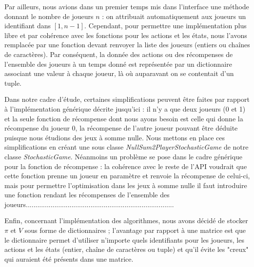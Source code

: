 \documentclass{article}
\begin{document}
Par ailleurs, nous avions dans un premier temps mis dans l'interface une méthode donnant le nombre de joueurs \(n\) : on attribuait automatiquement aux joueurs un identifiant dans \([1, n-1]\). Cependant, pour permettre une implémentation plus libre et par cohérence avec les fonctions pour les actions et les états, nous l'avons remplacée par une fonction devant renvoyer la liste des joueurs (entiers ou chaînes de caractères). Par conséquent, la donnée des actions ou des récompenses de l'ensemble des joueurs à un temps donné est représentée par un dictionnaire associant une valeur à chaque joueur, là où auparavant on se contentait d'un tuple.

Dans notre cadre d'étude, certaines simplifications peuvent être faites par rapport à l'implémentation générique décrite jusqu'ici : il n'y a que deux joueurs (0 et 1) et la seule fonction de récompense dont nous ayons besoin est celle qui donne la récompense du joueur 0, la récompense de l'autre joueur pouvant être déduite puisque nous étudions des jeux à somme nulle. Nous mettons en place ces simplifications en créant une sous classe \textit{NullSum2PlayerStochasticGame} de notre classe \textit{StochasticGame}. Néanmoins un problème se pose dans le cadre générique pour la fonction de récompense : la cohérence avec le reste de l'API voudrait que cette fonction prenne un joueur en paramètre et renvoie la récompense de celui-ci, mais pour permettre l'optimisation dans les jeux à somme nulle il faut introduire une fonction rendant les récompenses de l'ensemble des joueurs..............................................................................

Enfin, concernant l'implémentation des algorithmes, nous avons décidé de stocker \(\pi\) et \(V\) sous forme de dictionnaires ; l'avantage par rapport à une matrice est que le dictionnaire permet d'utiliser n'importe quels identifiants pour les joueurs, les actions et les états (entier, chaîne de caractères ou tuple) et qu'il évite les "creux" qui auraient été présents dans une matrice.



{}

\end{document}
